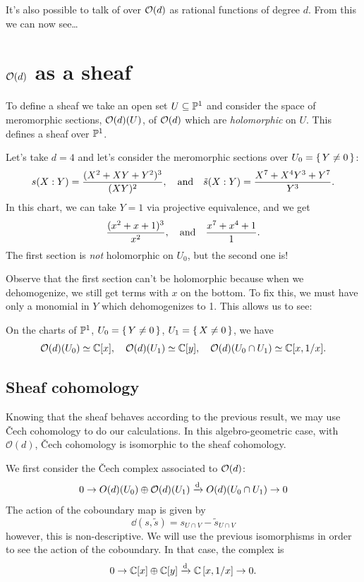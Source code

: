 \documentclass[12pt]{memoir}
\begin{document}
It's also possible to talk of  over $\mathcal{O}(d)$ as rational functions of degree $d$. From this we can now see\dots

\section{$\mathcal{O}(d)$ as a sheaf}

To define a sheaf we take an open set $U\subseteq\mathbb{P}^1$ and consider the space of meromorphic sections, $\mathcal{O}(d)(U)$, of $\mathcal{O}(d)$ which are \emph{holomorphic} on $U$. This defines a sheaf over $\mathbb{P}^1$. 

\begin{Ex}
Let's take $d=4$ and let's consider the meromorphic sections over $U_0=\{\,Y\neq 0\,\}$:
$$s(X:Y)=\frac{(X^2+XY+Y^2)^3}{(XY)^2},\quad\text{and}\quad \tilde{s}(X:Y)=\frac{X^7+X^4Y^3+Y^7}{Y^3}.$$
In this chart, we can take $Y=1$ via projective equivalence, and we get 
$$\frac{(x^2+x+1)^3}{x^2},\quad\text{and}\quad\frac{x^7+x^4+1}{1}.$$
The first section is \emph{not} holomorphic on $U_0$, but the second one is!
\end{Ex}

Observe that the first section can't be holomorphic because when we dehomogenize, we still get terms with $x$ on the bottom. To fix this, we must have only a monomial in $Y$ which dehomogenizes to 1.  This allows us to see:

\begin{Prop}
On the charts of $\mathbb{P}^1$, $U_0=\{\,Y\neq 0\,\}$, $U_1=\{\,X\neq 0\,\}$, we have 
$$\mathcal{O}(d)(U_0)\simeq\mathbb{C}[x],\quad\mathcal{O}(d)(U_1)\simeq\mathbb{C}[y],\quad\mathcal{O}(d)(U_0\cap U_1)\simeq\mathbb{C}[x,1/x].$$
\end{Prop}

\subsection{Sheaf cohomology}

Knowing that the sheaf behaves according to the previous result, we may use \v{C}ech cohomology to do our calculations. In this algebro-geometric case, with \(\mathcal{O}(d)\), \v{C}ech cohomology is isomorphic to the sheaf cohomology.\par 
We first consider the \v{C}ech complex associated to $\mathcal{O}(d)$:
$$0\to O(d)(U_0)\oplus\mathcal{O}(d)(U_1)\xrightarrow[]{\dd}O(d)(U_0\cap U_1)\to 0$$
The action of the coboundary map is given by 
$$\dd(s,\tilde{s})=s_{U\cap V}-\tilde{s}_{U\cap V}$$
however, this is non-descriptive. We will use the previous isomorphisms in order to see the action of the coboundary. In that case, the complex is 
$$0\to\mathbb{C}[x]\oplus\mathbb{C}[y]\xrightarrow[]{\dd}\mathbb{C}\left\lbrack x,1/x\right\rbrack\to 0.$$
\end{document}
